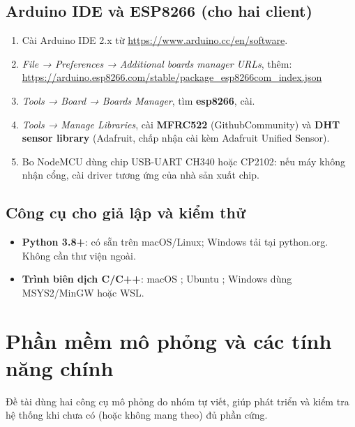 \subsection{Arduino IDE và ESP8266 (cho hai client)}
\begin{enumerate}
  \item Cài Arduino IDE 2.x từ \url{https://www.arduino.cc/en/software}.
  \item \emph{File → Preferences → Additional boards manager URLs}, thêm:\\
        \url{https://arduino.esp8266.com/stable/package_esp8266com_index.json}
  \item \emph{Tools → Board → Boards Manager}, tìm \textbf{esp8266}, cài.
  \item \emph{Tools → Manage Libraries}, cài \textbf{MFRC522} (GithubCommunity) và
        \textbf{DHT sensor library} (Adafruit, chấp nhận cài kèm Adafruit Unified Sensor).
  \item Bo NodeMCU dùng chip USB-UART CH340 hoặc CP2102: nếu máy không nhận cổng,
        cài driver tương ứng của nhà sản xuất chip.
\end{enumerate}

\subsection{Công cụ cho giả lập và kiểm thử}
\begin{itemize}
  \item \textbf{Python 3.8+}: có sẵn trên macOS/Linux; Windows tải tại python.org. Không cần thư viện ngoài.
  \item \textbf{Trình biên dịch C/C++}: macOS ; Ubuntu
        ; Windows dùng MSYS2/MinGW hoặc WSL.
\end{itemize}

\section{Phần mềm mô phỏng và các tính năng chính}
Đề tài dùng hai công cụ mô phỏng do nhóm tự viết, giúp phát triển và kiểm tra hệ
thống khi chưa có (hoặc không mang theo) đủ phần cứng.

